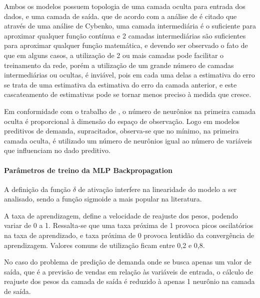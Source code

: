             Ambos os modelos possuem topologia de uma camada oculta para entrada dos dados, e uma camada de saída. que de acordo com  a análise de\cite{Braga2000}  é citado que através de uma análise de Cybenko, uma camada intermediária é o suficiente para aproximar qualquer função contínua e 2 camadas intermediárias são suficientes para aproximar qualquer função matemática, e devendo ser observado o fato de que em alguns casos, a utilização de 2 ou mais camadas pode facilitar o treinamento da rede, porém a utilização de um grande número de camadas intermediárias ou ocultas, é inviável, pois em cada uma delas a estimativa do erro se trata de uma estimativa da estimativa do erro da camada anterior, e este cascateamento de estimativas pode se tornar menos preciso à medida que cresce.
            
          Em conformidade com o trabalho de  \cite{Flavia2014}, o número de neurônios na primeira camada oculta é proporcional à dimensão do espaço de observação. Logo em modelos preditivos de demanda, supracitados, observa-se que no mínimo, na primeira camada oculta, é utilizado um número de neurônios igual ao número de variáveis que influenciam no dado preditivo.
            
            \paragraph*{Parâmetros de treino da MLP Backpropagation}
            A definição da função $\delta$ de ativação interfere na linearidade  do modelo a ser analisado, sendo a função sigmoide a mais popular na literatura. 
            
            A taxa de aprendizagem, define a velocidade de reajuste dos pesos, podendo variar de 0 a 1. Ressalta-se que uma taxa próxima de 1 provoca picos oscilatórios na taxa de aprendizado, e taxa próxima de 0 provoca lentidão da convergência de aprendizagem. Valores comuns de utilização ficam entre 0,2 e 0,8.
        
            No caso do problema de predição de demanda onde se busca apenas um valor de saída, que é a previsão de vendas em relação às variáveis de entrada, o cálculo de reajuste dos pesos da camada de saída é reduzido à apenas 1 neurônio na camada de saída.
            
